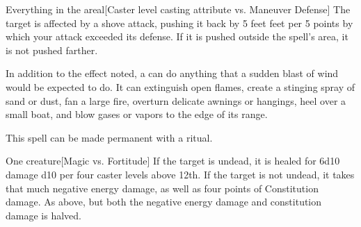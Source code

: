 \begin{spellheader}
\end{spellheader}
\begin{spelleffects}
    \begin{spelltarget}{Everything in the area}l[Caster level \add casting attribute vs. Maneuver Defense]
        \spellsuccess The target is affected by a shove attack, pushing it back by 5 feet  feet per 5 points by which your attack exceeded its defense. If it is pushed outside the spell's area, it is not pushed farther.
    \end{spelltarget}
\end{spelleffects}
\begin{spellfooter}
    \spellnotes In addition to the effect noted, a  can do anything that a sudden blast of wind would be expected to do. It can extinguish open flames, create a stinging spray of sand or dust, fan a large fire, overturn delicate awnings or hangings, heel over a small boat, and blow gases or vapors to the edge of its range.

    This spell can be made permanent with a  ritual.
\end{spellfooter}

\begin{comment}
\subsubsection{H}
\end{comment}

\begin{spellheader}
    \spellrng{\rngclose}
\end{spellheader}
\begin{spelleffects}
    \begin{spelltarget}{One creature}[Magic vs. Fortitude]
        \spelleffect If the target is undead, it is healed for 6d10 damage \add d10 per four caster levels above 12th.
        \spellsuccess If the target is not undead, it takes that much negative energy damage, as well as four points of Constitution damage.
        \spellfailure As above, but both the negative energy damage and constitution damage is halved.
    \end{spelltarget}
\end{spelleffects}

